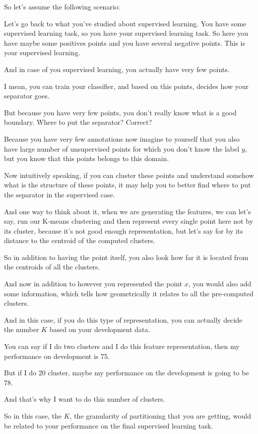 \documentclass[a4paper, 12pt]{article}
\begin{document}
So let's assume the following scenario:

Let's go back to what you've studied about supervised learning. You have some
supervised learning task, so you have your supervised learning task. So here you
have maybe some positives points and you have several negative points. This is
your supervised learning.

And in case of you supervised learning, you actually have very few points.

I mean, you can train your classifier, and based on this points, decides how
your separator goes.

But because you have very few points, you don't really know what is a good
boundary. Where to put the separator? Correct?

Because you have very few annotations now imagine to yourself that you also have
large number of unsupervised points for which you don't know the label \(y\),
but you know that this points belongs to this domain.

Now intuitively speaking, if you can cluster these points and understand somehow
what is the structure of these points, it may help you to better find where to
put the separator in the supervised case.

And one way to think about it, when we are generating the features, we can let's
say, run our K-means clustering and then represent every single point here not
by its cluster, because it's not good enough representation, but let's say for
by its distance to the centroid of the computed clusters.

So in addition to having the point itself, you also look how far it is located
from the centroids of all the clusters.

And now in addition to however you represented the point \(x\), you would also
add some information, which tells how geometrically it relates to all the
pre-computed clusters.

And in this case, if you do this type of representation, you can actually decide
the number \(K\) based on your development data.

You can say if I do two clusters and I do this feature representation, then my
performance on development is 75.

But if I do 20 cluster, maybe my performance on the development is going to
be 78.

And that's why I want to do this number of clusters.

So in this case, the \(K\), the granularity of partitioning that you are
getting, would be related to your performance on the final supervised learning
task.
\end{document}
